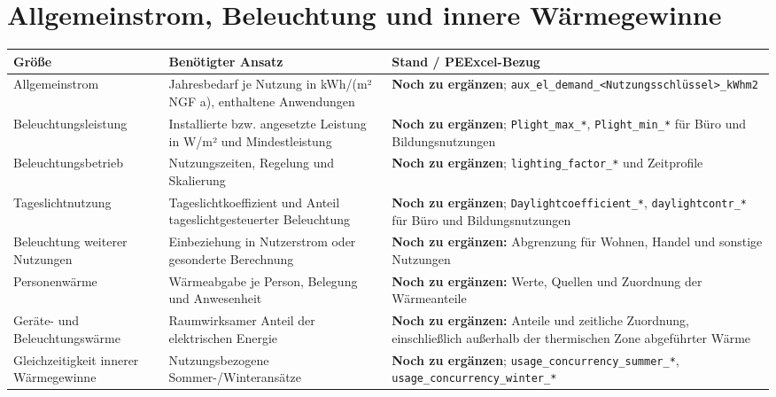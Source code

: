 \documentclass[
  ngerman,
  a4paper,
  DIV=11]{scrreprt}
\newcounter{none} %
\begin{document}
\section{Allgemeinstrom, Beleuchtung und innere
Wärmegewinne}\label{allgemeinstrom-beleuchtung-und-innere-wuxe4rmegewinne}

{\def\LTcaptype{none} %
\begin{longtable}[]{@{}
  >{\raggedright\arraybackslash}p{}
  >{\raggedright\arraybackslash}p{}
  >{\raggedright\arraybackslash}p{}@{}}
\toprule\noalign{}
\begin{minipage}[b]{\linewidth}\raggedright
Größe
\end{minipage} & \begin{minipage}[b]{\linewidth}\raggedright
Benötigter Ansatz
\end{minipage} & \begin{minipage}[b]{\linewidth}\raggedright
Stand / PEExcel-Bezug
\end{minipage} \\
\midrule\noalign{}
\endhead
\bottomrule\noalign{}
\endlastfoot
Allgemeinstrom & Jahresbedarf je Nutzung in kWh/(m² NGF a), enthaltene
Anwendungen & \textbf{Noch zu ergänzen};
\texttt{aux\_el\_demand\_\textless{}Nutzungsschlüssel\textgreater{}\_kWhm2} \\
Beleuchtungsleistung & Installierte bzw. angesetzte Leistung in W/m² und
Mindestleistung & \textbf{Noch zu ergänzen}; \texttt{Plight\_max\_*},
\texttt{Plight\_min\_*} für Büro und Bildungsnutzungen \\
Beleuchtungsbetrieb & Nutzungszeiten, Regelung und Skalierung &
\textbf{Noch zu ergänzen}; \texttt{lighting\_factor\_*} und
Zeitprofile \\
Tageslichtnutzung & Tageslichtkoeffizient und Anteil
tageslichtgesteuerter Beleuchtung & \textbf{Noch zu ergänzen};
\texttt{Daylightcoefficient\_*}, \texttt{daylightcontr\_*} für Büro und
Bildungsnutzungen \\
Beleuchtung weiterer Nutzungen & Einbeziehung in Nutzerstrom oder
gesonderte Berechnung & \textbf{Noch zu ergänzen:} Abgrenzung für
Wohnen, Handel und sonstige Nutzungen \\
Personenwärme & Wärmeabgabe je Person, Belegung und Anwesenheit &
\textbf{Noch zu ergänzen:} Werte, Quellen und Zuordnung der
Wärmeanteile \\
Geräte- und Beleuchtungswärme & Raumwirksamer Anteil der elektrischen
Energie & \textbf{Noch zu ergänzen:} Anteile und zeitliche Zuordnung,
einschließlich außerhalb der thermischen Zone abgeführter Wärme \\
Gleichzeitigkeit innerer Wärmegewinne & Nutzungsbezogene
Sommer-/Winteransätze & \textbf{Noch zu ergänzen};
\texttt{usage\_concurrency\_summer\_*},
\texttt{usage\_concurrency\_winter\_*} \\
\end{longtable}
}
\end{document}

